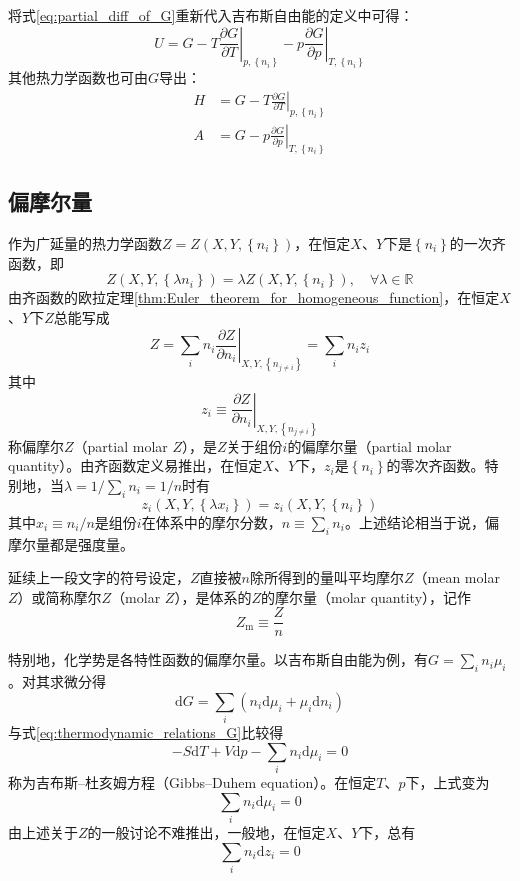 \documentclass[main.tex]{subfiles}
\begin{document}
将式\eqref{eq:partial_diff_of_G}重新代入吉布斯自由能的定义中可得：
\[
    U=G-T\left.\frac{\partial G}{\partial T}\right|_{p,\left\{n_i\right\}}-p\left.\frac{\partial G}{\partial p}\right|_{T,\left\{n_i\right\}}
\]
其他热力学函数也可由$G$导出：
\begin{align}
    H & =G-T\left.\frac{\partial G}{\partial T}\right|_{p,\left\{n_i\right\}} \\
    A & =G-p\left.\frac{\partial G}{\partial p}\right|_{T,\left\{n_i\right\}}
\end{align}

\subsection{偏摩尔量}
作为广延量的热力学函数$Z=Z\left(X,Y,\left\{n_i\right\}\right)$，在恒定$X$、$Y$下是$\left\{n_i\right\}$的一次齐函数，即
\[Z\left(X,Y,\left\{\lambda n_i\right\}\right)=\lambda Z\left(X,Y,\left\{n_i\right\}\right),\quad\forall\lambda\in\mathbb{R}\]
由齐函数的欧拉定理\ref{thm:Euler_theorem_for_homogeneous_function}，在恒定$X$、$Y$下$Z$总能写成
\[Z=\sum_i n_i\left.\frac{\partial Z}{\partial n_i}\right|_{X,Y,\left\{n_{j\neq i}\right\}}=\sum_i n_i z_i\]
其中
\[z_i\equiv\left.\frac{\partial Z}{\partial n_i}\right|_{X,Y,\left\{n_{j\neq i}\right\}}\]
称偏摩尔$Z$（partial molar $Z$），是$Z$关于组份$i$的偏摩尔量（partial molar quantity）。由齐函数定义易推出，在恒定$X$、$Y$下，$z_i$是$\left\{n_i\right\}$的零次齐函数。特别地，当$\lambda=1/\sum_i n_i=1/n$时有
\[z_i\left(X,Y,\left\{\lambda x_i\right\}\right)=z_i\left(X,Y,\left\{n_i\right\}\right)\]
其中$x_i\equiv n_i/n$是组份$i$在体系中的摩尔分数，$n\equiv\sum_i n_i$。上述结论相当于说，偏摩尔量都是强度量。

延续上一段文字的符号设定，$Z$直接被$n$除所得到的量叫平均摩尔$Z$（mean molar $Z$）或简称摩尔$Z$（molar $Z$），是体系的$Z$的摩尔量（molar quantity），记作
\[Z_\text{m}\equiv\frac{Z}{n}\]

特别地，化学势是各特性函数的偏摩尔量。以吉布斯自由能为例，有$G=\sum_i n_i\mu_i$。对其求微分得
\[\mathrm{d}G=\sum_i\left(n_i\mathrm{d}\mu_i+\mu_i\mathrm{d}n_i\right)\]
与式\eqref{eq:thermodynamic_relations_G}比较得
\begin{equation}\label{eq:Gibbs-Duhem eq.}
    -S\mathrm{d}T+V\mathrm{d}p-\sum_i n_i\mathrm{d}\mu_i=0
\end{equation}
称为吉布斯--杜亥姆方程（Gibbs--Duhem equation）。在恒定$T$、$p$下，上式变为
\[\sum_i n_i\mathrm{d}\mu_i=0\]
由上述关于$Z$的一般讨论不难推出，一般地，在恒定$X$、$Y$下，总有
\begin{equation}\label{eq:generalized_Gibbs_Duhem eq.}
    \sum_i n_i \mathrm{d}z_i=0
\end{equation}
\end{document}
